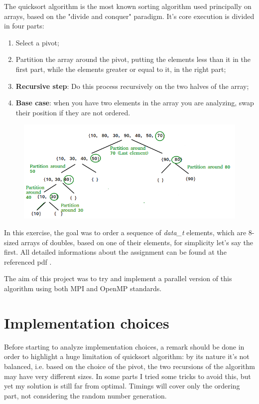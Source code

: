 \documentclass{article}
\begin{document}
	The quicksort algorithm is the most known sorting algorithm used principally on arrays, based on the "divide and conquer" paradigm.
	It's core execution is divided in four parts:
	\begin{enumerate}
		\item Select a pivot;
		\item Partition the array around the pivot, putting the elements less than it in the first part, while the elements greater or equal to it, in the right part;
		\item \textbf{Recursive step}: Do this process recursively on the two halves of the array;
		\item \textbf{Base case}: when you have two elements in the array you are analyzing, swap their position if they are not ordered.
	\end{enumerate}
	
	\begin{figure}[h]
		\centering
		\includegraphics[width=0.7\linewidth]{QuickSort2}
		\caption[Illustration of Quicksort algorithm]{}
		\label{fig:quicksort2}
	\end{figure}
	
	
	In this exercise, the goal was to order a sequence of \textit{data\_t} elements, which are 8-sized arrays of doubles, based on one of their elements, for simplicity let's say the first. All detailed informations about the assignment can be found at the referenced pdf \cite{ex2}.
	
	The aim of this project was to try and implement a parallel version of this algorithm using both MPI and OpenMP standards.
	
	\section{Implementation choices}
	Before starting to analyze implementation choices, a remark should be done in order to highlight a huge limitation of quicksort algorithm: by its nature it's not balanced, i.e. based on the choice of the pivot, the two recursions of the algorithm may have very different sizes. In some parts I tried some tricks to avoid this, but yet my solution is still far from optimal.
	Timings will cover only the ordering part, not considering the random number generation.
	
\end{document}
